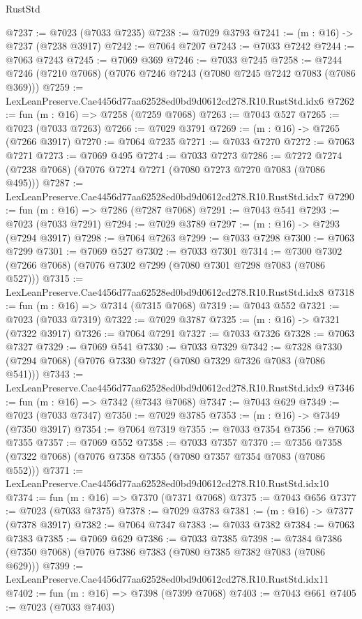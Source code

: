 \begin{lexlean}{RustStd}
\begin{coremodule}
@7237 := @7023 (@7033 @7235)
@7238 := @7029 @3793
@7241 := (m : @16) -> @7237 (@7238 @3917)
@7242 := @7064 @7207
@7243 := @7033 @7242
@7244 := @7063 @7243
@7245 := @7069 @369
@7246 := @7033 @7245
@7258 := @7244 @7246 (@7210 @7068) (@7076 @7246 @7243 (@7080 @7245 @7242 @7083 (@7086 @369)))
@7259 := LexLeanPreserve.Cae4456d77aa62528ed0bd9d0612cd278.R10.RustStd.idx6
@7262 := fun (m : @16) => @7258 (@7259 @7068)
@7263 := @7043 @527
@7265 := @7023 (@7033 @7263)
@7266 := @7029 @3791
@7269 := (m : @16) -> @7265 (@7266 @3917)
@7270 := @7064 @7235
@7271 := @7033 @7270
@7272 := @7063 @7271
@7273 := @7069 @495
@7274 := @7033 @7273
@7286 := @7272 @7274 (@7238 @7068) (@7076 @7274 @7271 (@7080 @7273 @7270 @7083 (@7086 @495)))
@7287 := LexLeanPreserve.Cae4456d77aa62528ed0bd9d0612cd278.R10.RustStd.idx7
@7290 := fun (m : @16) => @7286 (@7287 @7068)
@7291 := @7043 @541
@7293 := @7023 (@7033 @7291)
@7294 := @7029 @3789
@7297 := (m : @16) -> @7293 (@7294 @3917)
@7298 := @7064 @7263
@7299 := @7033 @7298
@7300 := @7063 @7299
@7301 := @7069 @527
@7302 := @7033 @7301
@7314 := @7300 @7302 (@7266 @7068) (@7076 @7302 @7299 (@7080 @7301 @7298 @7083 (@7086 @527)))
@7315 := LexLeanPreserve.Cae4456d77aa62528ed0bd9d0612cd278.R10.RustStd.idx8
@7318 := fun (m : @16) => @7314 (@7315 @7068)
@7319 := @7043 @552
@7321 := @7023 (@7033 @7319)
@7322 := @7029 @3787
@7325 := (m : @16) -> @7321 (@7322 @3917)
@7326 := @7064 @7291
@7327 := @7033 @7326
@7328 := @7063 @7327
@7329 := @7069 @541
@7330 := @7033 @7329
@7342 := @7328 @7330 (@7294 @7068) (@7076 @7330 @7327 (@7080 @7329 @7326 @7083 (@7086 @541)))
@7343 := LexLeanPreserve.Cae4456d77aa62528ed0bd9d0612cd278.R10.RustStd.idx9
@7346 := fun (m : @16) => @7342 (@7343 @7068)
@7347 := @7043 @629
@7349 := @7023 (@7033 @7347)
@7350 := @7029 @3785
@7353 := (m : @16) -> @7349 (@7350 @3917)
@7354 := @7064 @7319
@7355 := @7033 @7354
@7356 := @7063 @7355
@7357 := @7069 @552
@7358 := @7033 @7357
@7370 := @7356 @7358 (@7322 @7068) (@7076 @7358 @7355 (@7080 @7357 @7354 @7083 (@7086 @552)))
@7371 := LexLeanPreserve.Cae4456d77aa62528ed0bd9d0612cd278.R10.RustStd.idx10
@7374 := fun (m : @16) => @7370 (@7371 @7068)
@7375 := @7043 @656
@7377 := @7023 (@7033 @7375)
@7378 := @7029 @3783
@7381 := (m : @16) -> @7377 (@7378 @3917)
@7382 := @7064 @7347
@7383 := @7033 @7382
@7384 := @7063 @7383
@7385 := @7069 @629
@7386 := @7033 @7385
@7398 := @7384 @7386 (@7350 @7068) (@7076 @7386 @7383 (@7080 @7385 @7382 @7083 (@7086 @629)))
@7399 := LexLeanPreserve.Cae4456d77aa62528ed0bd9d0612cd278.R10.RustStd.idx11
@7402 := fun (m : @16) => @7398 (@7399 @7068)
@7403 := @7043 @661
@7405 := @7023 (@7033 @7403)

\end{coremodule}
\end{lexlean}
